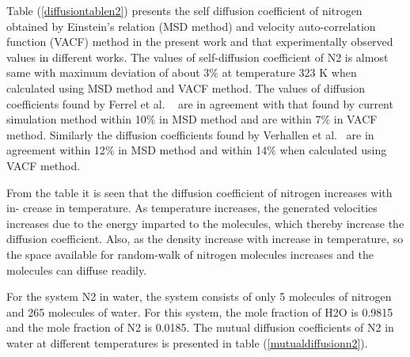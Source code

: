  Table (\ref{diffusiontablen2}) presents the self diffusion coefficient of nitrogen obtained by Einstein’s relation (MSD method) and velocity auto-correlation function (VACF)  method in the present work  and that experimentally observed values in different works. The values of self-diffusion  coefficient of N2 is almost same with maximum deviation of about 3$\%$ at temperature 323 K when calculated using MSD method and VACF method. The values of diffusion coefficients found by Ferrel et al. ~\citep{ferrell1967diffusion} are in agreement with that found by current simulation method within 10$\%$ in MSD method and are within 7$\%$ in VACF method. Similarly the  diffusion coefficients found by Verhallen et al.~\citep{verhallen1984diffusion} are in agreement within 12$\%$ in MSD
 method and within 14$\%$ when calculated using VACF method. 
 
 From the table it is seen that the diffusion coefficient of nitrogen increases with in-
 crease in temperature. As temperature increases, the generated velocities increases due
 to the energy imparted to the molecules, which thereby increase the diffusion coefficient.
 Also, as the density increase with increase in temperature, so the space available for
 random-walk of nitrogen molecules increases and the molecules can diffuse readily.
 
 For the system N2 in water, the system consists of only 5  molecules of nitrogen  and 265 molecules of water. For this system,  the mole fraction
 of H2O is 0.9815 and the mole fraction of N2 is 0.0185. The mutual diffusion coefficients
 of N2 in water at different temperatures is presented in table (\ref{mutualdiffusionn2}). 
 
\begin{table}[H]
 \centering
 \caption[The calculated value of mutual diffusion coefficient of Carbon monoxide in water.] {The calculated value of mutual diffusion coefficient of Carbon monoxide in water as a  function of temperature are listed.}
   \label{mutualdiffusionn2}
 \end{table}
 

